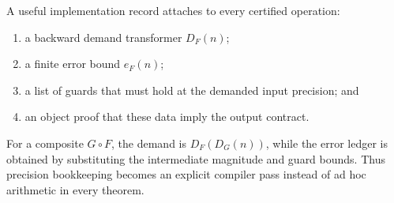 A useful implementation record attaches to every certified operation:
\begin{enumerate}[label=(\roman*)]
\item a backward demand transformer \(D_F(n)\);
\item a finite error bound \(e_F(n)\);
\item a list of guards that must hold at the demanded input precision; and
\item an object proof that these data imply the output contract.
\end{enumerate}
For a composite \(G\circ F\), the demand is
\(D_F(D_G(n))\), while the error ledger is obtained by substituting the
intermediate magnitude and guard bounds.  Thus precision bookkeeping becomes
an explicit compiler pass instead of ad hoc arithmetic in every theorem.
